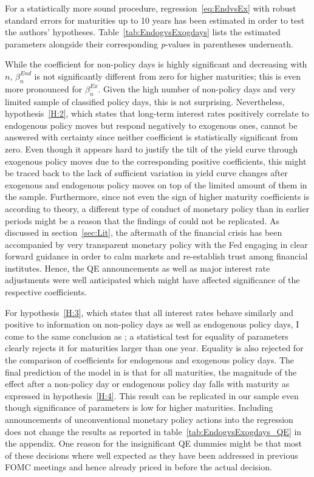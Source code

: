For a statistically more sound procedure, regression~\eqref{eq:EndvsEx} with robust standard errors for maturities up to 10 years has been estimated in order to test the authors' hypotheses. Table~\vref{tab:EndogvsExogdays} lists the estimated parameters alongside their corresponding \textit{p}-values in parentheses underneath.

%
While the coefficient for non-policy days is highly significant and decreasing with $n$, $\beta_n^{End}$ is not significantly different from zero for higher maturities; this is even more pronounced for $\beta_n^{Ex}$. Given the high number of non-policy days and very limited sample of classified policy days, this is not surprising. Nevertheless, hypothesis~\ref{H:2}, which states that long-term interest rates positively correlate to endogenous policy moves but respond negatively to exogenous ones, cannot be answered with certainty since neither coefficient is statistically significant from zero. Even though it appears hard to justify the tilt of the yield curve through exogenous policy moves due to the corresponding positive coefficients, this might be traced back to the lack of sufficient variation in yield curve changes after exogenous and endogenous policy moves on top of the limited amount of them in the sample. Furthermore, since not even the sign of higher maturity coefficients is according to theory, a different type of conduct of monetary policy than in earlier periods might be a reason that the findings of \textcite{Ellingsen.2003} could not be replicated. As discussed in section~\ref{sec:Lit}, the aftermath of the financial crisis has been accompanied by very transparent monetary policy with the Fed engaging in clear forward guidance in order to calm markets and re-establish trust among financial institutes. Hence, the QE announcements as well as major interest rate adjustments were well anticipated which might have affected significance of the respective coefficients.

For hypothesis~\ref{H:3}, which states that all interest rates behave similarly and positive to information on non-policy days as well as endogenous policy days, I come to the same conclusion as \textcite{Ellingsen.2003}; a statistical test for equality of parameters clearly rejects it for maturities larger than one year. Equality is also rejected for the comparison of coefficients for endogenous and exogenous policy days. The final prediction of the model in \textcite{Ellingsen.2001} is that for all maturities, the magnitude of the effect after a non-policy day or endogenous policy day falls with maturity as expressed in hypothesis~\ref{H:4}. This result can be replicated in our sample even though significance of parameters is low for higher maturities. 
Including announcements of unconventional monetary policy actions into the regression does not change the results as reported in table~\vref{tab:EndogvsExogdays_QE} in the appendix. One reason for the insignificant QE dummies might be that most of these decisions where well expected as they have been addressed in previous FOMC meetings and hence already priced in before the actual decision. 

